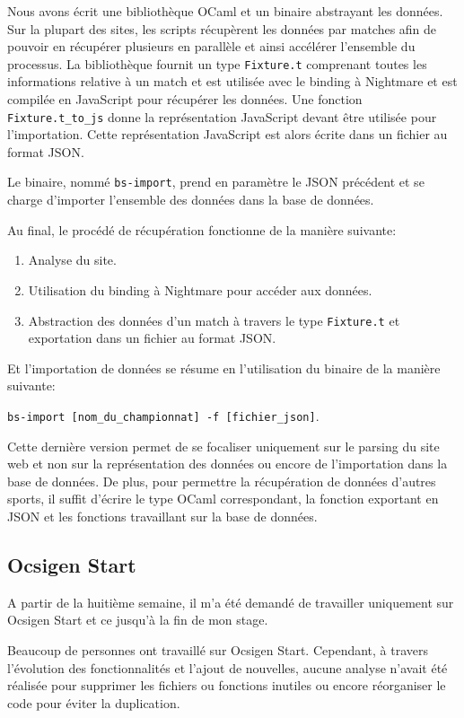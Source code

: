 Nous avons écrit une bibliothèque OCaml et un binaire abstrayant les
données.
Sur la plupart des sites, les scripts récupèrent les données par matches afin de
pouvoir en récupérer plusieurs en parallèle et ainsi accélérer l'ensemble
du processus. La
bibliothèque fournit un type \verb|Fixture.t| comprenant toutes les informations
relative à un match et est utilisée avec le binding à
Nightmare et est compilée en JavaScript pour récupérer les données. Une fonction
\verb|Fixture.t_to_js| donne la représentation JavaScript devant être
utilisée pour l'importation. Cette représentation JavaScript est alors écrite
dans un fichier au format JSON.

Le binaire, nommé \verb|bs-import|, prend en paramètre le JSON précédent et se charge d'importer l'ensemble des données dans la base de données.

Au final, le procédé de récupération fonctionne de la manière suivante:

\begin{enumerate}
\item Analyse du site.
\item Utilisation du binding à Nightmare pour accéder aux données.
  \item Abstraction des données d'un match à travers le type \verb|Fixture.t| et
    exportation dans un fichier au format JSON.
\end{enumerate}

Et l'importation de données se résume en l'utilisation du binaire de la manière
suivante:

\verb|bs-import [nom_du_championnat] -f [fichier_json]|.

Cette dernière version permet de se focaliser uniquement sur le parsing du site
web et non sur la représentation des données ou encore de l'importation dans la
base de données.
De plus, pour permettre la récupération de données d'autres sports, il suffit
d'écrire le type OCaml correspondant, la fonction exportant en JSON et les
fonctions travaillant sur la base de données.

\subsection{Ocsigen Start}

A partir de la huitième semaine, il m'a été demandé de travailler uniquement sur
Ocsigen Start et ce jusqu'à la fin de mon stage.

Beaucoup de personnes ont travaillé sur Ocsigen Start. Cependant, à
travers l'évolution des fonctionnalités et l'ajout de nouvelles, aucune analyse
n'avait été réalisée pour supprimer les fichiers ou fonctions inutiles ou encore
réorganiser le code pour éviter la duplication.

